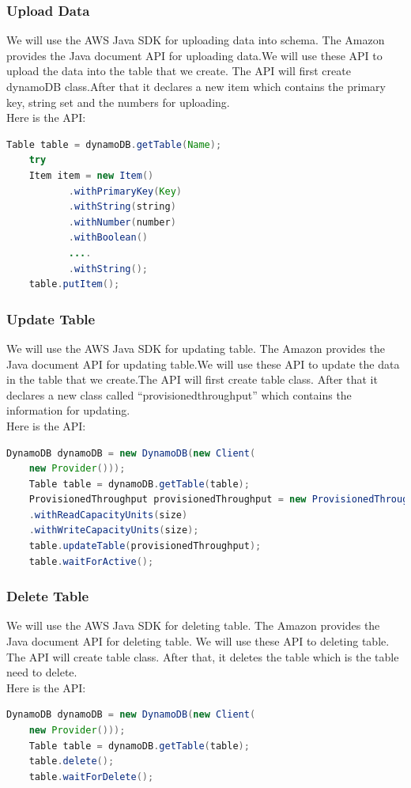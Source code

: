     	\subsubsection{Upload Data}
    	We will use the AWS Java SDK for uploading data into schema. The Amazon provides the Java document API for uploading data.We will use these API to upload the data into the table that we create. The API will first create dynamoDB class.After that it declares a new item which contains the primary key, string set and the numbers for uploading.\\
    Here is the API\cite{w1}:\\
    \begin{lstlisting}[language=Java, caption=API for Upload data]
    Table table = dynamoDB.getTable(Name);
    try 
    Item item = new Item()
           .withPrimaryKey(Key)
           .withString(string)
           .withNumber(number)
           .withBoolean()
           ....
           .withString();
    table.putItem();
  \end{lstlisting}
    \subsubsection{Update Table}
    We will use the AWS Java SDK for updating table. The Amazon provides the Java document API for updating table.We will use these API to update the data in the table that we create.The API will first create table class. After that it declares a new class called “provisionedthroughput” which contains the information for updating.\\
    Here is the API\cite{w1}:
      \begin{lstlisting}[language=Java, caption=API for update table]
    DynamoDB dynamoDB = new DynamoDB(new Client(
    new Provider()));
    Table table = dynamoDB.getTable(table);
    ProvisionedThroughput provisionedThroughput = new ProvisionedThroughput()
    .withReadCapacityUnits(size)
    .withWriteCapacityUnits(size);
    table.updateTable(provisionedThroughput);
    table.waitForActive();
\end{lstlisting}
    \subsubsection{Delete Table}
    We will use the AWS Java SDK for deleting table. The Amazon provides the Java document API for deleting table. We will use these API to deleting table. The API will create table class. After that, it deletes the table which is the table need to delete.\\
    Here is the API\cite{w1}:
      \begin{lstlisting}[language=Java, caption=API for delete data]
    DynamoDB dynamoDB = new DynamoDB(new Client(
    new Provider()));
    Table table = dynamoDB.getTable(table);
    table.delete();
    table.waitForDelete();
	\end{lstlisting}
